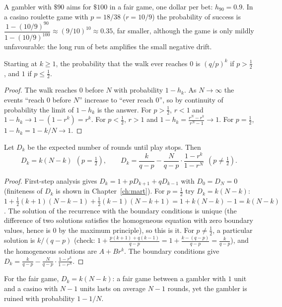 \begin{example}
A gambler with $\$90$ aims for $\$100$ in a fair game, one dollar per bet:
$h_{90}=0.9$. In a casino roulette game with $p=18/38$ ($r=10/9$) the probability of
success is $\dfrac{1-(10/9)^{90}}{1-(10/9)^{100}}\approx(9/10)^{10}\approx0.35$,
far smaller, although the game is only mildly unfavourable: the long run of bets
amplifies the small negative drift.
\end{example}

\begin{corollary}
Starting at $k\ge1$, the probability that the walk ever reaches $0$ is $(q/p)^k$ if
$p>\tfrac12$, and $1$ if $p\le\tfrac12$.
\end{corollary}
\begin{proof}
The walk reaches $0$ before $N$ with probability $1-h_k$. As $N\to\infty$ the events
``reach $0$ before $N$'' increase to ``ever reach $0$'', so by continuity of
probability the limit of $1-h_k$ is the answer. For $p>\tfrac12$, $r<1$ and
$1-h_k\to1-(1-r^k)=r^k$. For $p<\tfrac12$, $r>1$ and
$1-h_k=\frac{r^N-r^k}{r^N-1}\to1$. For $p=\tfrac12$, $1-h_k=1-k/N\to1$.
\end{proof}

\begin{theorem}\label{thm:duration}
Let $D_k$ be the expected number of rounds until play stops. Then
\[
D_k=k(N-k)\ \ (p=\tfrac12),\qquad
D_k=\frac k{q-p}-\frac N{q-p}\cdot\frac{1-r^k}{1-r^N}\ \ (p\ne\tfrac12).
\]
\end{theorem}
\begin{proof}
First-step analysis gives $D_k=1+pD_{k+1}+qD_{k-1}$ with $D_0=D_N=0$ (finiteness of
$D_k$ is shown in Chapter~\ref{ch:mart}). For $p=\tfrac12$ try $D_k=k(N-k)$:
$1+\frac12(k+1)(N-k-1)+\frac12(k-1)(N-k+1)=1+k(N-k)-1=k(N-k)$. The solution of the
recurrence with the boundary conditions is unique (the difference of two solutions
satisfies the homogeneous equation with zero boundary values, hence is $0$ by the
maximum principle), so this is it. For $p\ne\tfrac12$, a particular solution is
$k/(q-p)$ (check: $1+\frac{p(k+1)+q(k-1)}{q-p}=1+\frac{k-(q-p)}{q-p}=\frac k{q-p}$), and the
homogeneous solutions are $A+Br^k$. The boundary conditions give
$D_k=\frac k{q-p}-\frac N{q-p}\cdot\frac{1-r^k}{1-r^N}$.
\end{proof}

For the fair game, $D_k=k(N-k)$: a fair game between a gambler with $1$ unit and a
casino with $N-1$ units lasts on average $N-1$ rounds, yet the gambler is ruined with
probability $1-1/N$.

